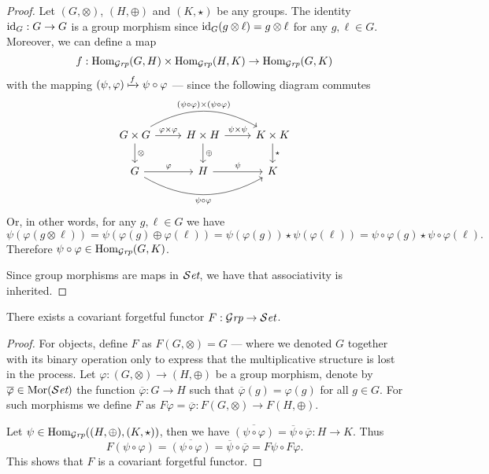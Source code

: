 \begin{proof}
  Let \((G, \otimes)\), \((H, \oplus)\) and \((K, \star)\) be any groups. The
  identity \(\operatorname{id}_G: G \to G\) is a group morphism since \(\operatorname{id}_G(g \otimes \ell)
  = g \otimes \ell\) for any \(g, \ell \in G\). Moreover, we can define a map
  \[
    f: \operatorname{Hom}_{{\mathcal{G}\textit{rp}}}(G, H) \times \operatorname{Hom}_{{\mathcal{G}\textit{rp}}}(H, K) \to \operatorname{Hom}_{{\mathcal{G}\textit{rp}}}(G, K)
  \]
  with the mapping \((\psi, \varphi) \xmapsto f \psi \circ \varphi\) --- since
  the following diagram commutes
  \[
    \begin{tikzcd}
      G \times G \ar[r, "\varphi \times \varphi"]
      \ar[d, "\otimes"]
      \ar[rr, bend left, "(\psi \circ \varphi) \times (\psi \circ \varphi)"]
      &H \times H \ar[r, "\psi \times \psi"]
      \ar[d, "\oplus"]
      &K \times K \ar[d, "\star"]
      \\
      G \ar[r, "\varphi"]
      \ar[rr, bend right, swap, "\psi \circ \varphi"]
      &H \ar[r, "\psi"] &K
    \end{tikzcd}
  \]
  Or, in other words, for any \(g, \ell \in G\) we have
  \[
    \psi(\varphi(g \otimes \ell))
    = \psi(\varphi(g) \oplus \varphi(\ell))
    = \psi(\varphi(g)) \star \psi(\varphi(\ell))
    = \psi \circ \varphi(g) \star \psi \circ \varphi(\ell).
  \]
  Therefore \(\psi \circ \varphi \in \operatorname{Hom}_{\mathcal{G}\textit{rp}}(G, K)\).

  Since group morphisms are maps in \({\mathcal{S}\textit{et}}\), we have that associativity is
  inherited.
\end{proof}

\begin{proposition}
  There exists a covariant forgetful functor \(F: {\mathcal{G}\textit{rp}} \to {\mathcal{S}\textit{et}}\).
\end{proposition}

\begin{proof}
  For objects, define \(F\) as \(F(G, \otimes) = G\) --- where we denoted \(G\)
  together with its binary operation only to express that the multiplicative
  structure is lost in the process. Let \(\varphi: (G, \otimes) \to (H,
  \oplus)\) be a group morphism, denote by \(\overline \varphi \in \operatorname{Mor}({\mathcal{S}\textit{et}})\)
  the function \(\overline\varphi: G \to H\) such that \(\overline\varphi(g) =
  \varphi(g)\) for all \(g \in G\). For such morphisms we define \(F\) as
  \(F\varphi = \overline\varphi: F(G, \otimes) \to F(H, \oplus)\).

  Let \(\psi \in \operatorname{Hom}_{\mathcal{G}\textit{rp}}((H, \oplus), (K, \star))\), then we have
  \(\overline{(\psi \circ \varphi)} = \overline \psi \circ \overline \varphi: H
  \to K\). Thus
  \[
    F(\psi \circ \varphi) = \overline{(\psi \circ \varphi)}
    = \overline \psi \circ \overline \varphi = F\psi \circ F\varphi.
  \]
  This shows that \(F\) is a covariant forgetful functor.
\end{proof}

